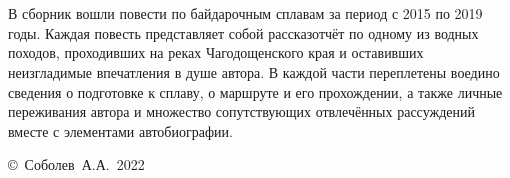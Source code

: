 \chapter*{}

В сборник вошли повести по байдарочным сплавам за период с 2015 по 2019 годы. Каждая повесть представляет собой рассказ\sdash отчёт по одному из водных походов, проходивших на реках Чагодощенского края и оставивших неизгладимые впечатления в душе автора. В каждой части переплетены воедино сведения о подготовке к сплаву, о маршруте и его прохождении, а также личные переживания автора и множество сопутствующих отвлечённых рассуждений вместе с элементами автобиографии.

\vspace{\fill}
\begin{flushright}
	\copyright~Соболев~А.А.~2022
\end{flushright}
